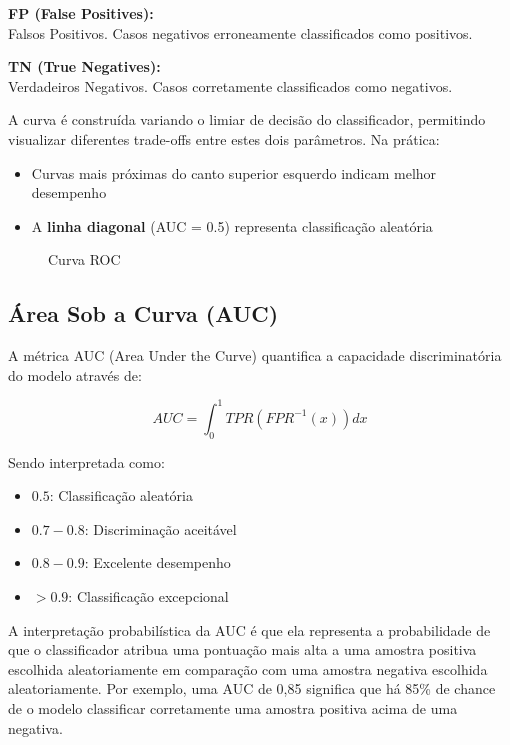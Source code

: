 \documentclass[
  portuguese,
]{estat/estat}
\makeatletter
\newcommand*\pandocbounded[1]{%
  \sbox\pandoc@box{#1}%
  \Gscale@div\@tempa{\textheight}{\dimexpr\ht\pandoc@box+\dp\pandoc@box\relax}%
  \Gscale@div\@tempb{\linewidth}{\wd\pandoc@box}%
  \ifdim\@tempb\p@<\@tempa\p@\let\@tempa\@tempb\fi%
  \ifdim\@tempa\p@<\p@\scalebox{\@tempa}{\usebox\pandoc@box}%
  \else\usebox{\pandoc@box}%
  \fi%
}
\providecommand{\tightlist}{%
  \setlength{\itemsep}{0pt}\setlength{\parskip}{0pt}}
\makeatother
\begin{document}
\textbf{FP (False Positives):}\\
Falsos Positivos. Casos negativos erroneamente classificados como
positivos.

\textbf{TN (True Negatives):}\\
Verdadeiros Negativos. Casos corretamente classificados como negativos.

A curva é construída variando o limiar de decisão do classificador,
permitindo visualizar diferentes trade-offs entre estes dois parâmetros.
Na prática:

\begin{itemize}
\item
  Curvas mais próximas do canto superior esquerdo indicam melhor
  desempenho
\item
  A \textbf{linha diagonal} (AUC = 0.5) representa classificação
  aleatória
\end{itemize}

\begin{figure}[H]

\caption{Curva ROC}

{\centering \pandocbounded{\texttt{[image: images/curvaROC.png]}}

}

\end{figure}%

\subsection{Área Sob a Curva (AUC)}\label{uxe1rea-sob-a-curva-auc}

A métrica AUC (Area Under the Curve) quantifica a capacidade
discriminatória do modelo através de:

\[
AUC = \int_{0}^{1} TPR(FPR^{-1}(x)) dx
\]

Sendo interpretada como:

\begin{itemize}
\tightlist
\item
  \(0.5\): Classificação aleatória
\item
  \(0.7-0.8\): Discriminação aceitável
\item
  \(0.8-0.9\): Excelente desempenho
\item
  \(>0.9\): Classificação excepcional
\end{itemize}

A interpretação probabilística da AUC é que ela representa a
probabilidade de que o classificador atribua uma pontuação mais alta a
uma amostra positiva escolhida aleatoriamente em comparação com uma
amostra negativa escolhida aleatoriamente. Por exemplo, uma AUC de 0,85
significa que há 85\% de chance de o modelo classificar corretamente uma
amostra positiva acima de uma negativa.
\end{document}

